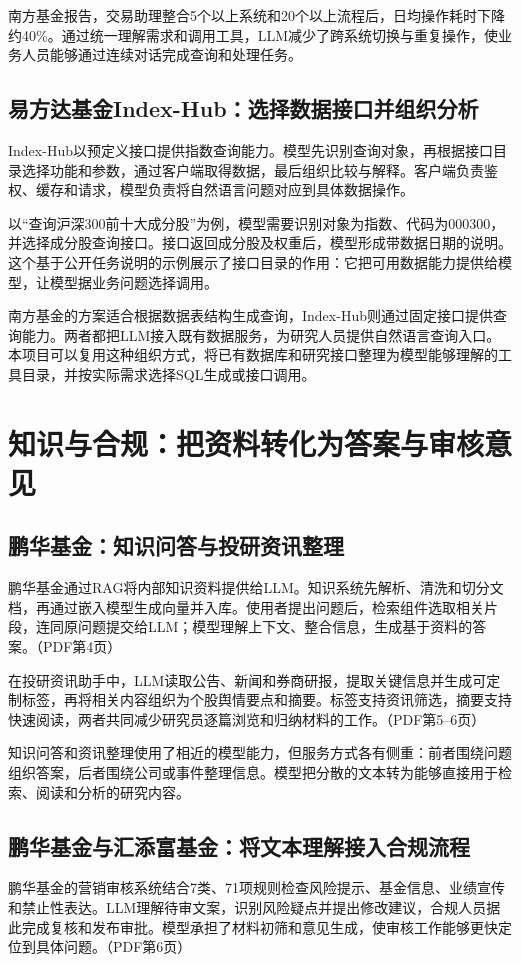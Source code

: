 \documentclass[11pt,a4paper,fontset=none]{ctexart}
\begin{document}
南方基金报告，交易助理整合5个以上系统和20个以上流程后，日均操作耗时下降约40\%。通过统一理解需求和调用工具，LLM减少了跨系统切换与重复操作，使业务人员能够通过连续对话完成查询和处理任务。

\subsection{易方达基金Index-Hub：选择数据接口并组织分析}
Index-Hub以预定义接口提供指数查询能力。模型先识别查询对象，再根据接口目录选择功能和参数，通过客户端取得数据，最后组织比较与解释。客户端负责鉴权、缓存和请求，模型负责将自然语言问题对应到具体数据操作。

以“查询沪深300前十大成分股”为例，模型需要识别对象为指数、代码为000300，并选择成分股查询接口。接口返回成分股及权重后，模型形成带数据日期的说明。这个基于公开任务说明的示例展示了接口目录的作用：它把可用数据能力提供给模型，让模型据业务问题选择调用。

南方基金的方案适合根据数据表结构生成查询，Index-Hub则通过固定接口提供查询能力。两者都把LLM接入既有数据服务，为研究人员提供自然语言查询入口。本项目可以复用这种组织方式，将已有数据库和研究接口整理为模型能够理解的工具目录，并按实际需求选择SQL生成或接口调用。

\section{知识与合规：把资料转化为答案与审核意见}
\subsection{鹏华基金：知识问答与投研资讯整理}
鹏华基金通过RAG将内部知识资料提供给LLM。知识系统先解析、清洗和切分文档，再通过嵌入模型生成向量并入库。使用者提出问题后，检索组件选取相关片段，连同原问题提交给LLM；模型理解上下文、整合信息，生成基于资料的答案。（PDF第4页）

在投研资讯助手中，LLM读取公告、新闻和券商研报，提取关键信息并生成可定制标签，再将相关内容组织为个股舆情要点和摘要。标签支持资讯筛选，摘要支持快速阅读，两者共同减少研究员逐篇浏览和归纳材料的工作。（PDF第5--6页）

知识问答和资讯整理使用了相近的模型能力，但服务方式各有侧重：前者围绕问题组织答案，后者围绕公司或事件整理信息。模型把分散的文本转为能够直接用于检索、阅读和分析的研究内容。

\subsection{鹏华基金与汇添富基金：将文本理解接入合规流程}
鹏华基金的营销审核系统结合7类、71项规则检查风险提示、基金信息、业绩宣传和禁止性表达。LLM理解待审文案，识别风险疑点并提出修改建议，合规人员据此完成复核和发布审批。模型承担了材料初筛和意见生成，使审核工作能够更快定位到具体问题。（PDF第6页）
\end{document}
